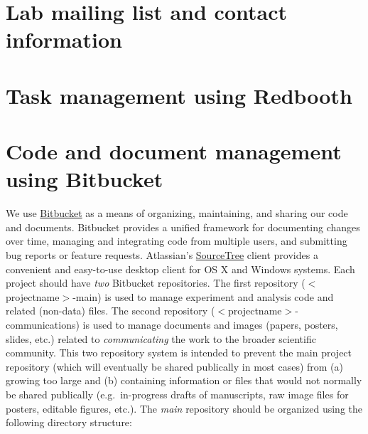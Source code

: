 \documentclass{tufte-book} %
\begin{document}
 \section{Lab mailing list and contact information}

\section{Task management using Redbooth}

 \section{Code and document management using Bitbucket}\label{sec:bitbucket}
 We use \href{https://www.bitbucket.org/}{Bitbucket} as a means of organizing, maintaining, and sharing
 our code and documents.  Bitbucket provides a unified framework for
 documenting changes over time, managing and integrating code from
 multiple users, and submitting bug reports or feature requests. 
Atlassian's
 \href{https://www.atlassian.com/software/sourcetree/overview?_mid=1ba3573dadf246f44f2a97bc50bfd72e&gclid=Cj0KEQiA4OqnBRDAj9aazvPji9ABEiQANq28oBGvgRhznXBb_RDL6QRe0IM7vvEUXFkRDoWBSbpmsmAaAkCE8P8HAQ}{SourceTree}
 client provides a convenient and easy-to-use desktop client for OS X
 and Windows systems.  Each project should have \textit{two} Bitbucket
 repositories.  The first repository ($<$projectname$>$-main) is used to
 manage experiment and analysis code and related (non-data) files.
 The second repository ($<$projectname$>$-communications) is used to
 manage documents and images (papers, posters, slides, etc.) related
 to \textit{communicating} the work to the broader scientific
 community.  This two repository system is intended to prevent the main project
 repository (which will eventually be shared publically in most cases)
 from (a) growing too large and (b) containing information or files
 that would not normally be shared publically (e.g.\ in-progress
 drafts of manuscripts, raw image files for posters, editable figures,
 etc.).  The \textit{main} repository should be organized using the following directory structure:
\end{document}
